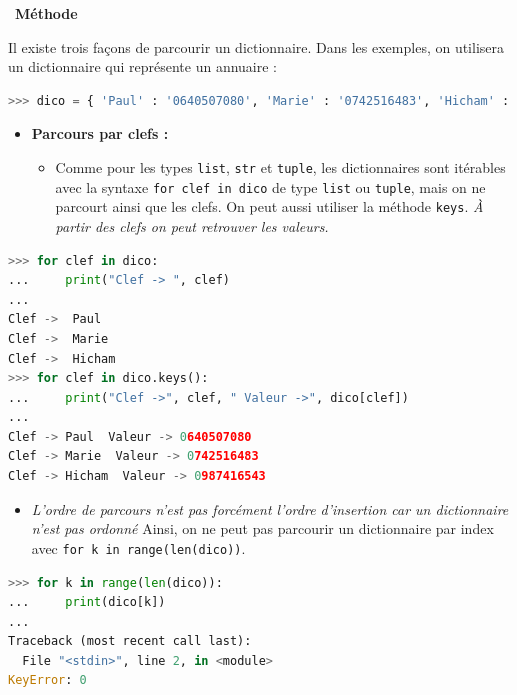 \documentclass[
  11pt,
]{article}
\newcommand{\passthrough}[1]{#1}
\providecommand{\tightlist}{%
  \setlength{\itemsep}{0pt}\setlength{\parskip}{0pt}}
\newcounter{cours}
\newenvironment{methode}[1]
{\par \medskip    \noindent  
 \begin {bclogo}[arrondi =0.1,logo=\bcoutil, marge=4,noborder = true] {~\textbf{Méthode}   {\itshape #1} }  \par}
{
\end{bclogo}
 \par \bigskip }
\begin{document}
\begin{methode}{}

Il existe trois façons de parcourir un dictionnaire. Dans les exemples,
on utilisera un dictionnaire qui représente un annuaire :

\begin{lstlisting}[language=Python]
>>> dico = { 'Paul' : '0640507080', 'Marie' : '0742516483', 'Hicham' : '0987416543'}
\end{lstlisting}

\begin{itemize}
\item
  \textbf{Parcours par clefs :}

  \begin{itemize}
  \tightlist
  \item
    Comme pour les types \passthrough{\lstinline!list!},
    \passthrough{\lstinline!str!} et \passthrough{\lstinline!tuple!},
    les dictionnaires sont itérables avec la syntaxe
    \passthrough{\lstinline!for clef in dico!} de type
    \passthrough{\lstinline!list!} ou \passthrough{\lstinline!tuple!},
    mais on ne parcourt ainsi que les clefs. On peut aussi utiliser la
    méthode \passthrough{\lstinline!keys!}. \emph{À partir des clefs on
    peut retrouver les valeurs.}
  \end{itemize}
\end{itemize}

\begin{lstlisting}[language=Python]
>>> for clef in dico:
...     print("Clef -> ", clef)
... 
Clef ->  Paul
Clef ->  Marie
Clef ->  Hicham
>>> for clef in dico.keys():
...     print("Clef ->", clef, " Valeur ->", dico[clef])
... 
Clef -> Paul  Valeur -> 0640507080
Clef -> Marie  Valeur -> 0742516483
Clef -> Hicham  Valeur -> 0987416543
\end{lstlisting}

\begin{itemize}
\tightlist
\item
  \emph{L'ordre de parcours n'est pas forcément l'ordre d'insertion car
  un dictionnaire n'est pas ordonné} Ainsi, on ne peut pas parcourir un
  dictionnaire par index avec
  \passthrough{\lstinline!for k in range(len(dico))!}.
\end{itemize}

\begin{lstlisting}[language=Python]
>>> for k in range(len(dico)):
...     print(dico[k])
... 
Traceback (most recent call last):
  File "<stdin>", line 2, in <module>
KeyError: 0
\end{lstlisting}


\end{methode}
\end{document}

